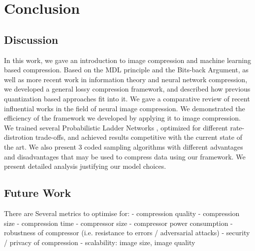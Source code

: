 
\chapter{Conclusion}

\section{Discussion}
\par
In this work, we gave an introduction to image compression and machine learning
based compression. Based on the MDL principle and the Bits-back Argument, as
well as more recent work in information theory and neural network compression,
we developed a general lossy compression framework, and described how previous
quantization based approaches fit into it. We gave a comparative review of
recent influential works in the field of neural image compression. We
demonstrated the efficiency of the framework we developed by applying it to
image compression. We trained several Probabilistic Ladder Networks , optimized
for different rate-distrotion trade-offs, and achieved results competitive with
the current state of the art. We also present 3 coded sampling algorithms with
different advantages and disadvantages that may be used to compress data using
our framework. We present detailed analysis justifying our model choices.

\section{Future Work}
\par 
There are 
Several metrics to optimise for:
- compression quality
- compression size
- compression time
- compressor size
- compressor power consumption
- robustness of compressor (i.e. resistance to errors / adversarial attacks)
- security / privacy of compression
- scalability: image size, image quality


